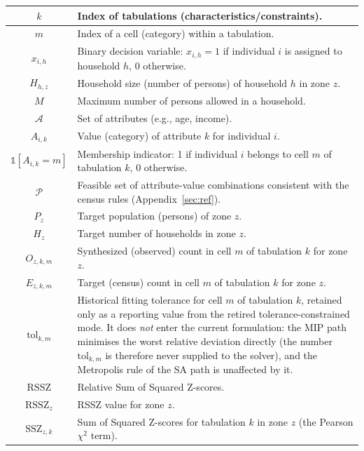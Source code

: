 \begin{longtable}{|c|p{10cm}|}
\( k \) & Index of tabulations (characteristics/constraints). \\ \hline
\( m \) & Index of a cell (category) within a tabulation. \\ \hline
\( x_{i,h} \) & Binary decision variable: \( x_{i,h}=1 \) if individual \( i \) is assigned to household \( h \), 0 otherwise. \\ \hline
\( H_{h,z} \) & Household size (number of persons) of household \( h \) in zone \( z \). \\ \hline
\( M \) & Maximum number of persons allowed in a household. \\ \hline
\( \mathcal{A} \) & Set of attributes (e.g., age, income). \\ \hline
\( A_{i,k} \) & Value (category) of attribute \( k \) for individual \( i \). \\ \hline
\( \mathbb{1}[A_{i,k}=m] \) & Membership indicator: 1 if individual \( i \) belongs to cell \( m \) of tabulation \( k \), 0 otherwise. \\ \hline
\( \mathcal{P} \) & Feasible set of attribute-value combinations consistent with the census rules (Appendix~\ref{sec:ref}). \\ \hline
\( P_z \) & Target population (persons) of zone \( z \). \\ \hline
\( H_z \) & Target number of households in zone \( z \). \\ \hline
\( O_{z,k,m} \) & Synthesized (observed) count in cell \( m \) of tabulation \( k \) for zone \( z \). \\ \hline
\( E_{z,k,m} \) & Target (census) count in cell \( m \) of tabulation \( k \) for zone \( z \). \\ \hline
\( \text{tol}_{k,m} \) & Historical fitting tolerance for cell \( m \) of tabulation \( k \), retained only as a reporting value from the retired tolerance-constrained mode. It does \emph{not} enter the current formulation: the MIP path minimises the worst relative deviation directly (the number \( \text{tol}_{k,m} \) is therefore never supplied to the solver), and the Metropolis rule of the SA path is unaffected by it. \\ \hline
\( \text{RSSZ} \) & Relative Sum of Squared Z-scores. \\ \hline
\( \text{RSSZ}_z \) & RSSZ value for zone \( z \). \\ \hline
\( \text{SSZ}_{z,k} \) & Sum of Squared Z-scores for tabulation \( k \) in zone \( z \) (the Pearson \(\chi^2\) term). \\ \hline

\end{longtable}

